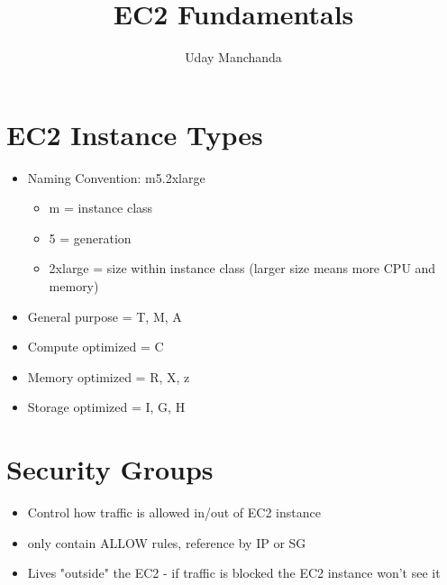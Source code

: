 \documentclass[]{scrartcl}
\title{EC2 Fundamentals}
\author{Uday Manchanda}
\begin{document}
\maketitle

\section{EC2 Instance Types}
\begin{itemize}
	\item Naming Convention: m5.2xlarge
	\begin{itemize}
		\item m = instance class
		\item 5 = generation
		\item 2xlarge = size within instance class (larger size means more CPU and memory)
	\end{itemize}
	\item General purpose = T, M, A
	\item Compute optimized = C
	\item Memory optimized = R, X, z
	\item Storage optimized = I, G, H
\end{itemize}

\section{Security Groups}
\begin{itemize}
	\item Control how traffic is allowed in/out of EC2 instance
	\item only contain ALLOW rules, reference by IP or SG
	\item Lives "outside" the EC2 - if traffic is blocked the EC2 instance won't see it
\end{itemize}
\end{document}
